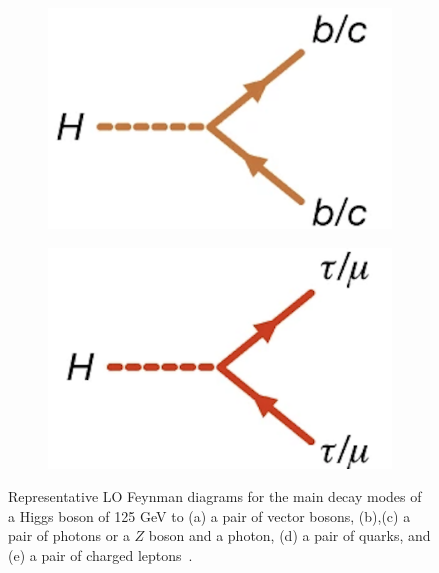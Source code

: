 \begin{figure}[htbp]
\begin{subfigure}[b]{0.3\linewidth}
        \caption{}
        \label{fig:h_decays:Zg}
    \end{subfigure}
    
    \vspace{0.7em} %
    
    \begin{subfigure}[b]{0.3\linewidth}
        \centering
        \includegraphics[width=\linewidth]{images/Hbb.png}
        \caption{}
        \label{fig:h_decays:bb}
    \end{subfigure}
    \hspace{0.1\linewidth}
    \begin{subfigure}[b]{0.3\linewidth}
        \centering
        \includegraphics[width=\linewidth]{images/Htt.png}
        \caption{}
        \label{fig:h_decays:tautau}
    \end{subfigure}
    
    \caption{Representative LO Feynman diagrams for the main decay modes of a Higgs boson of 125 GeV to (a) a pair of vector bosons, (b),(c) a pair of photons or a $Z$ boson and a photon, (d) a pair of quarks, and (e) a pair of charged leptons~\cite{Nature_ATLAS}.}
    \label{fig:h_decays}
\end{figure}

